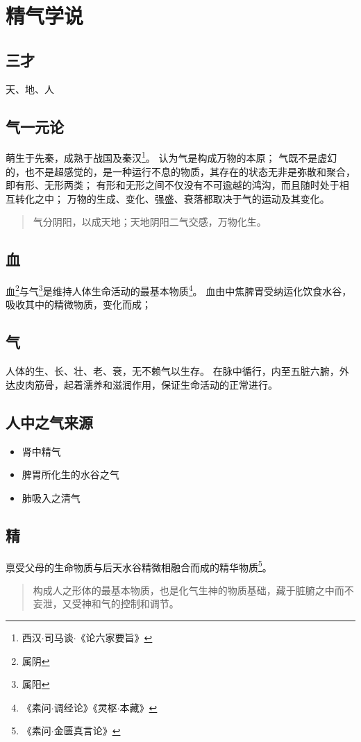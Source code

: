 \section{精气学说}

\subsection{三才}
天、地、人

\subsection{气一元论}
萌生于先秦，成熟于战国及秦汉\footnote{西汉$\cdot$司马谈$\cdot$《论六家要旨》}。
认为气是构成万物的本原；
气既不是虚幻的，也不是超感觉的，是一种运行不息的物质，其存在的状态无非是弥散和聚合，即有形、无形两类；
有形和无形之间不仅没有不可逾越的鸿沟，而且随时处于相互转化之中；
万物的生成、变化、强盛、衰落都取决于气的运动及其变化。
\begin{quote}
  气分阴阳，以成天地；天地阴阳二气交感，万物化生。
\end{quote}

\subsection{血}
血\footnote{属阴}与气\footnote{属阳}是维持人体生命活动的最基本物质\footnote{《素问$\cdot$调经论》《灵枢$\cdot$本藏》}。
血由中焦脾胃受纳运化饮食水谷，吸收其中的精微物质，变化而成；

\subsection{气}
人体的生、长、壮、老、衰，无不赖气以生存。
在脉中循行，内至五脏六腑，外达皮肉筋骨，起着濡养和滋润作用，保证生命活动的正常进行。

\subsection{人中之气来源}
\begin{itemize}
  \item 肾中精气
  \item 脾胃所化生的水谷之气
  \item 肺吸入之清气
\end{itemize}

\subsection{精}
禀受父母的生命物质与后天水谷精微相融合而成的精华物质\footnote{《素问$\cdot$金匮真言论》}。
\begin{quote}
  构成人之形体的最基本物质，也是化气生神的物质基础，藏于脏腑之中而不妄泄，又受神和气的控制和调节。
\end{quote}

